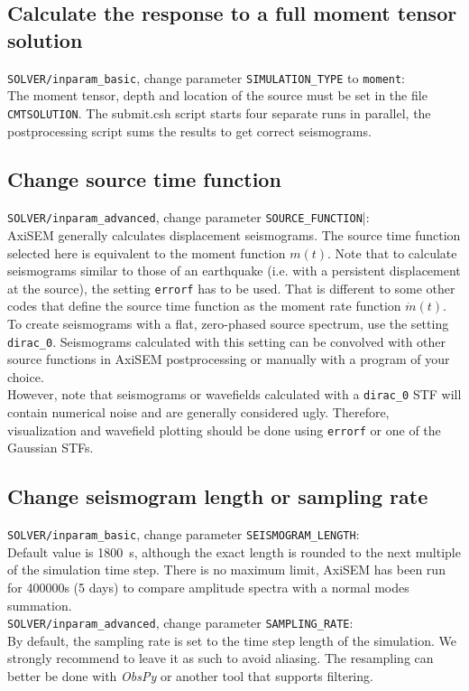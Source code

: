 \documentclass{article}
\begin{document}
\subsection{Calculate the response to a full moment tensor solution}
\verb|SOLVER/inparam_basic|, change parameter \verb|SIMULATION_TYPE| to \verb|moment|:\\
The moment tensor, depth and location of the source must be set in the file
\verb|CMTSOLUTION|. The submit.csh script starts four separate runs in parallel, the
postprocessing script sums the results to get correct seismograms.


\subsection{Change source time function}
\verb|SOLVER/inparam_advanced|, change parameter \verb|SOURCE_FUNCTION||:\\
AxiSEM generally calculates displacement seismograms. The source time function selected here is equivalent to the moment function $m(t)$. Note that to calculate seismograms similar to those of an earthquake (i.e. with a persistent displacement at the source), the setting \verb|errorf| has to be used. That is different to some other codes that define the source time function as the moment rate function $\dot{m}(t)$.\\
To create seismograms with a flat, zero-phased source spectrum, use the setting \verb|dirac_0|. Seismograms calculated with this setting can be convolved with other source functions in AxiSEM postprocessing or manually with a program of your choice.\\
However, note that seismograms or wavefields calculated with a \verb|dirac_0| STF will contain numerical noise and are generally considered ugly. Therefore, visualization and wavefield plotting should be done using \verb|errorf| or one of the Gaussian STFs.


\subsection{Change seismogram length or sampling rate}
\verb|SOLVER/inparam_basic|, change parameter \verb|SEISMOGRAM_LENGTH|:\\
Default value is 1800~s, although the exact length is rounded to the next multiple of the
simulation time step. There is no maximum limit, AxiSEM has been run for 400000s (5 days)
to compare amplitude spectra with a normal modes summation.\\
\verb|SOLVER/inparam_advanced|, change parameter \verb|SAMPLING_RATE|:\\
By default, the sampling rate is set to the time step length of the simulation. We
strongly recommend to leave it as such to avoid aliasing. The resampling can better be
done with \textit{ObsPy} or another tool that supports filtering.
\end{document}
